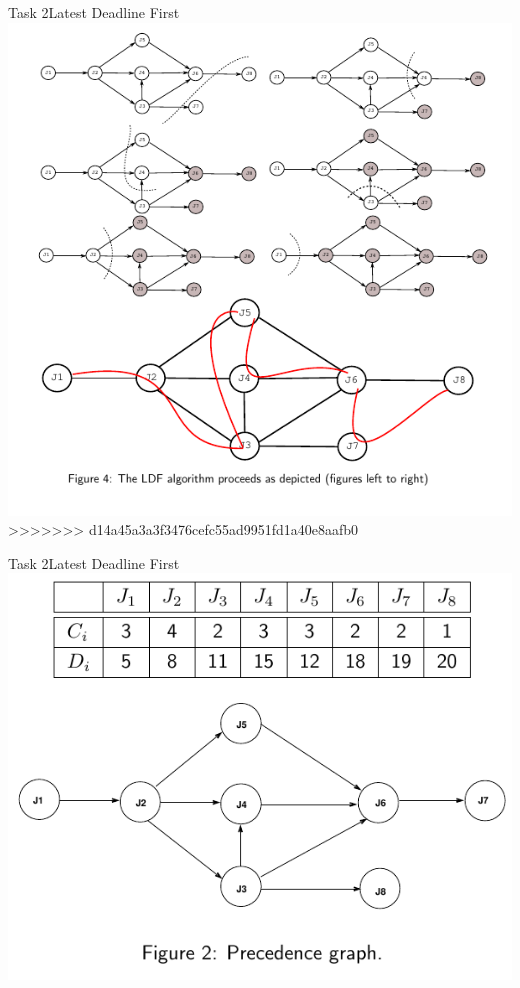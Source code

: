 \begin{frame}{Task 2}{Latest Deadline First}
  \centering
  \includegraphics[height=0.7\paperheight]{./figures/2_steps.png}
>>>>>>> d14a45a3a3f3476cefc55ad9951fd1a40e8aafb0
\end{frame}

\begin{frame}{Task 2}{Latest Deadline First}
  \centering
  \includegraphics[height=0.7\paperheight]{./figures/2_tab_graph.png}
\end{frame}

